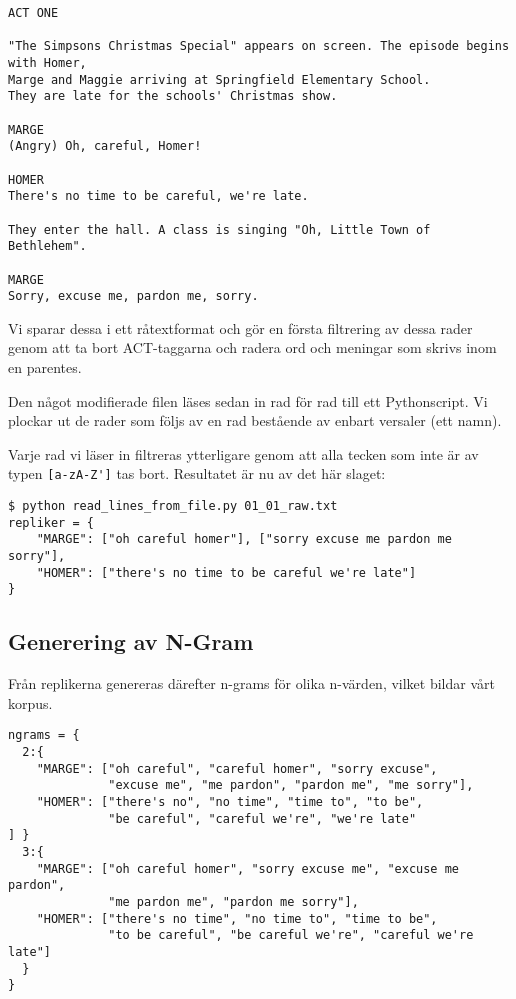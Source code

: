 \documentclass[a4paper]{article}
\begin{document}
\begin{verbatim}
ACT ONE

"The Simpsons Christmas Special" appears on screen. The episode begins with Homer,
Marge and Maggie arriving at Springfield Elementary School.
They are late for the schools' Christmas show.

MARGE
(Angry) Oh, careful, Homer!

HOMER
There's no time to be careful, we're late.

They enter the hall. A class is singing "Oh, Little Town of Bethlehem".

MARGE
Sorry, excuse me, pardon me, sorry.
\end{verbatim}

Vi sparar dessa i ett råtextformat och gör en första filtrering av dessa rader genom att ta bort ACT-taggarna och radera ord och meningar som skrivs inom en parentes.

Den något modifierade filen läses sedan in rad för rad till ett Pythonscript.
Vi plockar ut de rader som följs av en rad bestående av enbart versaler (ett namn).

Varje rad vi läser in filtreras ytterligare genom att alla tecken som inte är av typen \verb=[a-zA-Z']= tas bort. Resultatet är nu av det här slaget:

\begin{verbatim}
$ python read_lines_from_file.py 01_01_raw.txt
repliker = {
    "MARGE": ["oh careful homer"], ["sorry excuse me pardon me sorry"],
    "HOMER": ["there's no time to be careful we're late"]
}
\end{verbatim}

\subsection{Generering av N-Gram}
Från replikerna genereras därefter n-grams för olika n-värden, vilket bildar vårt korpus.

\begin{verbatim}
ngrams = {
  2:{
    "MARGE": ["oh careful", "careful homer", "sorry excuse",
              "excuse me", "me pardon", "pardon me", "me sorry"],
    "HOMER": ["there's no", "no time", "time to", "to be",
    		  "be careful", "careful we're", "we're late" 
] }
  3:{
    "MARGE": ["oh careful homer", "sorry excuse me", "excuse me pardon",
              "me pardon me", "pardon me sorry"],
    "HOMER": ["there's no time", "no time to", "time to be",
              "to be careful", "be careful we're", "careful we're late"]
  }
}
\end{verbatim}
\end{document}
